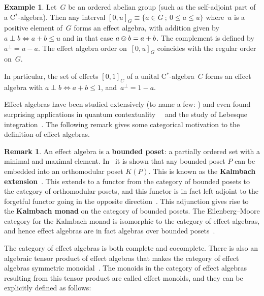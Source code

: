 \documentclass[10pt,conference]{IEEEtran}
\newcommand\Define[1]{\textbf{#1}}
\newcounter{counter}
\theoremstyle{definition}
\newtheorem{example}[counter]{Example}
\newtheorem{remark}[counter]{Remark}
\begin{document}
\begin{example}\label{ex:cstaralgebra}
Let~$G$ be an ordered abelian group
    (such as the self-adjoint part of a C$^*$-algebra).
    Then any interval $[0,u]_G \equiv
    \{a\in G~;~ 0\leq a \leq u\}$ where~$u$
    is a positive element of~$G$ forms an effect algebra, with
    addition given by $a\perp
    b \iff a+b\leq u$ and in that case  $a\ovee b = a+b$. The complement is
    defined by $a^\perp = u-a$.
    The effect algebra order on~$[0,u]_G$ coincides
    with the regular
    order on~$G$.  
    
    In particular,
    the set of effects $[0,1]_C$
    of a unital C$^*$-algebra~$C$ forms an effect algebra
    with $a\perp b\iff a+b\leq 1$,
    and~$a^\perp = 1-a$.
\end{example}

Effect algebras have been studied extensively
    (to name a few:
    \cite{chajda2009every,ravindran1997structure,
    gudder1996examples,gudder1996effect,jenvca2001blocks,
    dvurevcenskij2010every,foulis2010type})
    and even found surprising applications in quantum contextuality~~\cite{staton2018effect,roumen2016cohomology} and the study of Lebesque integration~\cite{jacobs2015effect}.
The following remark gives some categorical motivation to the definition of effect algebras.

\begin{remark}
  An effect algebra is a \Define{bounded poset}: a partially ordered
  set with a minimal and maximal element. In~\cite{mayet1995classes}
  it is shown that any bounded poset $P$ can be embedded into an
  orthomodular poset $K(P)$. This is known as the \Define{Kalmbach
  extension}~\cite{kalmbach1977orthomodular}. This extends to a
  functor from the category of bounded posets to the category of
  orthomodular posets, and this functor is in fact left adjoint to
  the forgetful functor going in the opposite
  direction~\cite{harding2004remarks}. This adjunction gives rise
  to the \Define{Kalmbach monad} on the category of bounded posets.
  The Eilenberg--Moore category for the Kalmbach monad is isomorphic
  to the category of effect algebras, and hence effect algebras
    are in fact algebras over bounded posets~\cite{jenvca2015effect}.
\end{remark}

The category of effect algebras is both complete and cocomplete.
There is also an algebraic tensor product of effect algebras that makes the category of effect algebras symmetric
monoidal~\cite{jacobs2012coreflections}. The monoids in the category
of effect algebras resulting from this tensor product are called
effect monoids, and they can be explicitly defined as follows:
\end{document}
